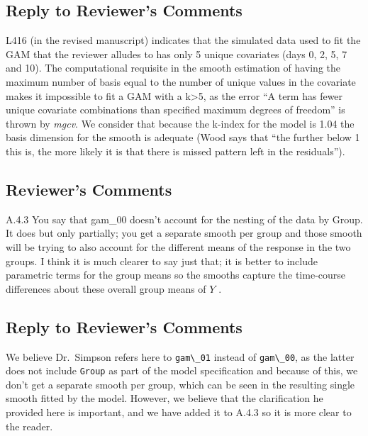 \documentclass[
]{article}
\newcommand{\passthrough}[1]{#1}
\begin{document}
\hypertarget{section-10}{%
\subsection{\texorpdfstring{\textcolor{reviewersblue} {Reply to Reviewer's Comments}}{}}\label{section-10}}

L416 (in the revised manuscript) indicates that the simulated data used to fit the GAM that the reviewer alludes to has only 5 unique covariates (days 0, 2, 5, 7 and 10). The computational requisite in the smooth estimation of having the maximum number of basis equal to the number of unique values in the covariate makes it impossible to fit a GAM with a k\textgreater5, as the error ``A term has fewer unique covariate combinations than specified maximum degrees of freedom'' is thrown by \emph{mgcv}. We consider that because the k-index for the model is 1.04 the basis dimension for the smooth is adequate (Wood says that ``the further below 1 this is, the more likely it is that there is missed pattern left in the residuals'').

\hypertarget{reviewers-comments-10}{%
\subsection{Reviewer's Comments}\label{reviewers-comments-10}}

A.4.3 You say that gam\_00 doesn't account for the nesting of the data by Group. It does but only partially; you get a separate smooth per group and those smooth will be trying to also account for the different means of the response in the two groups. I think it is much clearer to say just that; it is better to include
parametric terms for the group means so the smooths capture the time-course differences about these overall group means of \(Y\) .

\hypertarget{section-11}{%
\subsection{\texorpdfstring{\textcolor{reviewersblue} {Reply to Reviewer's Comments}}{}}\label{section-11}}

We believe Dr.~Simpson refers here to \passthrough{\lstinline!gam\_01!} instead of \passthrough{\lstinline!gam\_00!}, as the latter does not include \passthrough{\lstinline!Group!} as part of the model specification and because of this, we don't get a separate smooth per group, which can be seen in the resulting single smooth fitted by the model. However, we believe that the clarification he provided here is important, and we have added it to A.4.3 so it is more clear to the reader.
\end{document}
